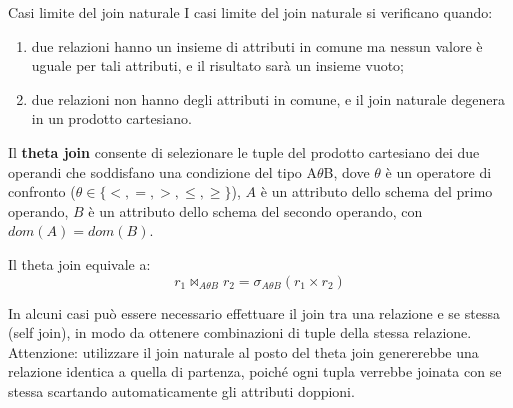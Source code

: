 \begin{Proposition}{Casi limite del join naturale}{}
    I casi limite del join naturale si verificano quando:
    \begin{enumerate}
        \item due relazioni hanno un insieme di attributi in comune ma nessun valore è uguale per tali attributi, e il risultato sarà un insieme vuoto;
        \item due relazioni non hanno degli attributi in comune, e il join naturale degenera in un prodotto cartesiano.
    \end{enumerate}
\end{Proposition}

\begin{redbar}
    Il \textbf{theta join} consente di selezionare le tuple del prodotto cartesiano dei due operandi che soddisfano una condizione del tipo A$\theta$B, dove $\theta$ è un operatore di confronto ($\theta\in\{<,=,>,\leq,\geq\}$), $A$ è un attributo dello schema del primo operando, $B$ è un attributo dello schema del secondo operando, con $dom(A)=dom(B)$.

    Il theta join equivale a:
    \begin{equation*}
        r_1\bowtie_{A\theta B}r_2=\sigma_{A\theta B}(r_1\times r_2)
    \end{equation*}
\end{redbar}

In alcuni casi può essere necessario effettuare il join tra una relazione e se stessa (self join), in modo da ottenere combinazioni di tuple della stessa relazione. Attenzione: utilizzare il join naturale al posto del theta join genererebbe una relazione identica a quella di partenza, poiché ogni tupla verrebbe joinata con se stessa scartando automaticamente gli attributi doppioni.


